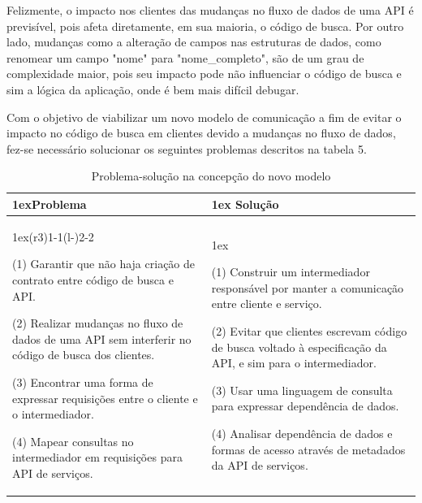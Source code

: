 Felizmente, o impacto nos clientes das mudanças no fluxo de dados de uma API é previsível, pois afeta diretamente, em sua maioria, o código de busca. Por outro lado, mudanças como a alteração de campos nas estruturas de dados, como renomear um campo "nome" para "nome\_completo", são de um grau de complexidade maior, pois seu impacto pode não influenciar o código de busca e sim a lógica da aplicação, onde é bem mais difícil debugar.

Com o objetivo de viabilizar um novo modelo de comunicação a fim de evitar o impacto no código de busca em clientes devido a mudanças no fluxo de dados, fez-se necessário solucionar os seguintes problemas descritos na tabela 5. \\

\begin{table}[H]
  \begin{tabularx}{\linewidth}{>{\parskip1ex}X@{\kern4\tabcolsep}>{\parskip1ex}X}
    \toprule
    \hfil\bfseries Problema
    &
    \hfil\bfseries Solução
    \\\cmidrule(r{3\tabcolsep}){1-1}\cmidrule(l{-\tabcolsep}){2-2}

    (1) Garantir que não haja criação de contrato entre código de busca e API.\par
    (2) Realizar mudanças no fluxo de dados de uma API sem interferir no código de busca dos clientes.\par
    (3) Encontrar uma forma de expressar requisições entre o cliente e o intermediador.\par
    (4) Mapear consultas no intermediador em requisições para API de serviços.\par

    &

    (1) Construir um intermediador responsável por manter a comunicação entre cliente e serviço.\par
	(2) Evitar que clientes escrevam código de busca voltado à especificação da API, e sim para o intermediador.\par
    (3) Usar uma linguagem de consulta para expressar dependência de dados.\par
    (4) Analisar dependência de dados e formas de acesso através de metadados da API de serviços.\par

\\\bottomrule
  \end{tabularx}
  \caption{Problema-solução na concepção do novo modelo}
\end{table}

